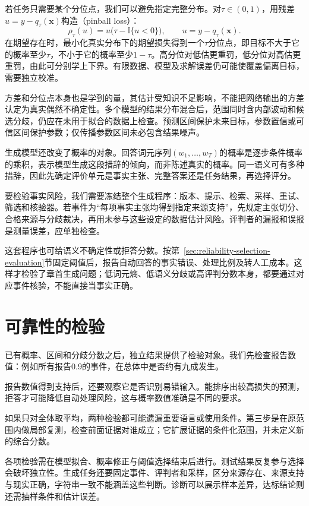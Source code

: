 若任务只需要某个分位点，我们可以避免指定完整分布。对$\tau\in(0,1)$，用残差$u=y-q_\tau(\bm{x})$构造（pinball loss）：
\[
\rho_\tau(u)=u\bigl(\tau-\mathbb I\{u<0\}\bigr),
 \qquad u=y-q_\tau(\bm{x}).
\]
在期望存在时，最小化真实分布下的期望损失得到一个$\tau$分位点，即目标不大于它的概率至少$\tau$，不小于它的概率至少$1-\tau$。高分位对低估更重罚，低分位对高估更重罚，由此可分别学上下界。有限数据、模型及求解误差仍可能使覆盖偏离目标，需要独立校准。

方差和分位点本身也是学到的量，其估计受知识不足影响，不能把网络输出的方差认定为真实偶然不确定性。多个模型的结果分布混合后，范围同时含内部波动和候选分歧，仍应在未用于拟合的数据上检查。预测区间保护未来目标，参数置信或可信区间保护参数；仅传播参数区间未必包含结果噪声。

生成模型还改变了概率的对象。回答词元序列$(w_1,\ldots,w_T)$的概率是逐步条件概率的乘积，表示模型生成这段措辞的倾向，而非陈述真实的概率。同一语义可有多种措辞，因此先确定评价单元是事实主张、完整答案还是任务结果，再选择评分。

要检验事实风险，我们需要冻结整个生成程序：版本、提示、检索、采样、重试、筛选和核验器。若事件为“每项事实主张均得到指定来源支持”，先规定主张切分、合格来源与分歧裁决，再用未参与这些设定的数据估计风险。评判者的漏报和误报是测量误差，应单独检查。

这套程序也可给语义不确定性或拒答分数。按第~\ref{sec:reliability-selection-evaluation}节固定阈值后，报告自动回答的事实错误、处理比例及转人工成本。这样才检验了章首生成问题；低词元熵、低语义分歧或高评判分数本身，都要通过对应事件核验，不能直接当事实正确。

\section{可靠性的检验}
\label{sec:reliability-evaluation}

已有概率、区间和分歧分数之后，独立结果提供了检验对象。我们先检查报告数值：例如所有报告0.9的事件，在总体中是否约有九成发生。

报告数值得到支持后，还要观察它是否识别易错输入。能排序出较高损失的预测，拒答才可能降低自动处理风险，这与概率数值准确是不同的要求。

如果只对全体取平均，两种检验都可能遗漏重要语言或使用条件。第三步是在原范围内做局部复测，检查前面证据对谁成立；它扩展证据的条件化范围，并未定义新的综合分数。

各项检验需在模型拟合、概率修正与阈值选择结束后进行。测试结果反复参与选择会破坏独立性。生成任务还要固定事件、评判者和采样，区分来源存在、来源支持与现实正确，字符串一致不能涵盖这些判断。诊断可以展示样本差异，达标结论则还需抽样条件和估计误差。

